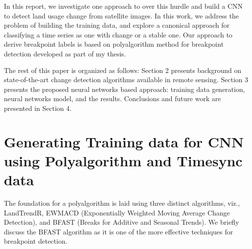 \documentclass[a4paper,11pt]{article}
\begin{document}
In this report, we investigate one approach to over this hurdle and build a CNN to detect land usage change
from satellite images.
In this work, we address the problem of building the training data,
and explore a canonical approach for classifying a time series as one
with change or a stable one. 
Our approach to derive breakpoint labels is based on polyalgorithm method for breakpoint detection
developed as part of my thesis.

The rest of this paper is organized as follows: Section 2 presents
background on state-of-the-art change detection algorithms available in 
remote sensing. Section 3 presents the proposed neural networks based
approach: training data generation, neural networks model, and the results.
Conclusions and future work are presented in Section 4.


\section{Generating Training data for CNN using Polyalgorithm and Timesync data}
The foundation for a polyalgorithm 
is laid using three distinct algorithms, viz., LandTrendR, EWMACD (Exponentially
Weighted Moving Average Change Detection), and BFAST (Breaks for Additive
and Seasonal Trends).
We briefly discuss the BFAST algorithm as it is one of the more effective techniques
for breakpoint detection.
\end{document}
